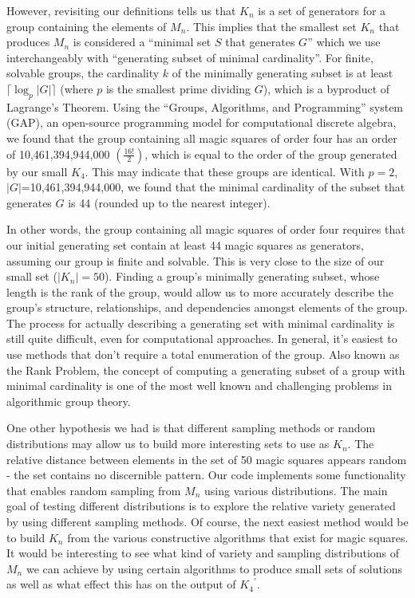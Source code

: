 \documentclass[12pt]{report}
\begin{document}
\par However, revisiting our definitions tells us that $K_n$ is a set of generators for a group
containing the elements of $M_n$. This implies that the smallest set $K_n$ that produces $M_n$ is
considered a ``minimal set $S$ that generates $G$'' which we  use interchangeably with ``generating
subset of minimal cardinality''. For finite, solvable groups, the cardinality $k$ of the minimally
generating subset is at least $\lceil\log_{p}{\left|G\right|}\rceil$ (where $p$ is the smallest
prime dividing $G$), which is a byproduct of Lagrange's Theorem\cite{Arvind}. Using the ``Groups,
Algorithms, and Programming'' system (GAP), an open-source programming model for computational
discrete algebra, we found that the group containing all magic squares of order four has an order
of 10,461,394,944,000 $\left(\frac{16!}{2}\right)$, which is equal to the order of the group
generated by our small $K_4$\cite{GAP4}. This may indicate that these groups are identical. With
$p=2$, $\left|G\right|$=10,461,394,944,000, we found that the minimal cardinality of the subset
that generates $G$ is 44 (rounded up to the nearest integer).

\par In other words, the group containing all magic squares of order four requires that our initial
generating set contain at least 44 magic squares as generators, assuming our group is finite and
solvable. This is very close to the size of our small set ($\left|K_n\right|=50$). Finding a
group's minimally generating subset, whose length is the rank of the group, would allow us to more
accurately describe the group's structure, relationships, and dependencies amongst elements of the
group. The process for actually describing a generating set with minimal cardinality is still quite
difficult, even for computational approaches. In general, it's easiest to use methods that don't
require a total enumeration of the group. Also known as the Rank Problem, the concept of computing
a generating subset of a group with minimal cardinality is one of the most well known and
challenging problems in algorithmic group theory\cite{Baumslag}.

\par One other hypothesis we had is that different sampling methods or random distributions may
allow us to build more interesting sets to use as $K_n$. The relative distance between elements in
the set of 50 magic squares appears random \hyphen{} the set contains no discernible pattern. Our
code implements some functionality that enables random sampling from $M_n$ using various
distributions. The main goal of testing different distributions is to explore the relative variety
generated by using different sampling methods. Of course, the next easiest method would be to build
$K_n$ from the various constructive algorithms that exist for magic squares. It would be
interesting to see what kind of variety and sampling distributions of $M_n$ we can achieve by using
certain algorithms to produce small sets of solutions as well as what effect this has on the output
of ${K_4}^\prime$.
\end{document}
